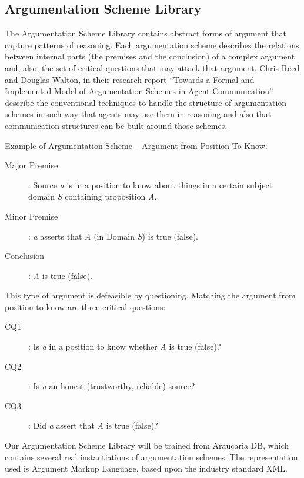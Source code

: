 \documentclass[lnbip]{svmultln}
\begin{document}
\subsection {Argumentation Scheme Library}
\par
The Argumentation Scheme Library contains abstract forms of argument that capture patterns of reasoning. Each argumentation scheme describes the relations between internal parts (the premises and the conclusion) of a complex argument and, also, the set of critical questions that may attack that argument. Chris Reed and Douglas Walton, in their research report ``Towards a Formal and Implemented Model of Argumentation Schemes in Agent Communication'' describe the conventional techniques to handle the structure of argumentation schemes in such way that agents may use them in reasoning and also that communication structures can be built around those schemes.
\par
Example of Argumentation Scheme – Argument from Position To Know:
\begin{description}
\item[Major Premise]: Source \emph{a} is in a position to know about things in a certain subject domain \emph{S} containing proposition \emph{A}.
\item[Minor Premise]: \emph{a} asserts that \emph{A} (in Domain \emph{S}) is true (false).
\item[Conclusion]: \emph{A} is true (false).
\end{description}
This type of argument is defeasible by questioning. Matching the argument from position to know are three critical questions:
\begin{description}
\item[CQ1]: Is \emph{a} in a position to know whether \emph{A} is true (false)?
\item[CQ2]: Is \emph{a} an honest (trustworthy, reliable) source?
\item[CQ3]: Did \emph{a} assert that \emph{A} is true (false)?
\end{description}
\par
Our Argumentation Scheme Library will be trained from Araucaria DB, which contains several real instantiations of argumentation schemes. The representation used is Argument Markup Language, based upon the industry standard XML.
\end{document}
